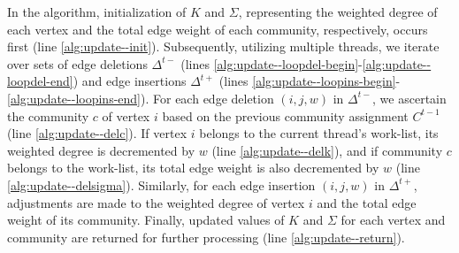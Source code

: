 In the algorithm, initialization of $K$ and $\Sigma$, representing the weighted degree of each vertex and the total edge weight of each community, respectively, occurs first (line \ref{alg:update--init}). Subsequently, utilizing multiple threads, we iterate over sets of edge deletions $\Delta^{t-}$ (lines \ref{alg:update--loopdel-begin}-\ref{alg:update--loopdel-end}) and edge insertions $\Delta^{t+}$ (lines \ref{alg:update--loopins-begin}-\ref{alg:update--loopins-end}). For each edge deletion $(i, j, w)$ in $\Delta^{t-}$, we ascertain the community $c$ of vertex $i$ based on the previous community assignment $C^{t-1}$ (line \ref{alg:update--delc}). If vertex $i$ belongs to the current thread's work-list, its weighted degree is decremented by $w$ (line \ref{alg:update--delk}), and if community $c$ belongs to the work-list, its total edge weight is also decremented by $w$ (line \ref{alg:update--delsigma}). Similarly, for each edge insertion $(i, j, w)$ in $\Delta^{t+}$, adjustments are made to the weighted degree of vertex $i$ and the total edge weight of its community. Finally, updated values of $K$ and $\Sigma$ for each vertex and community are returned for further processing (line \ref{alg:update--return}).


